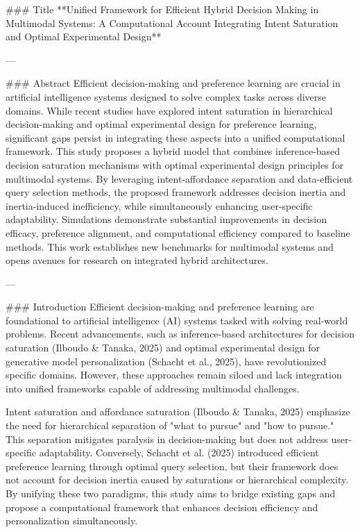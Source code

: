 ### Title  
**Unified Framework for Efficient Hybrid Decision Making in Multimodal Systems: A Computational Account Integrating Intent Saturation and Optimal Experimental Design**

---

### Abstract  
Efficient decision-making and preference learning are crucial in artificial intelligence systems designed to solve complex tasks across diverse domains. While recent studies have explored intent saturation in hierarchical decision-making and optimal experimental design for preference learning, significant gaps persist in integrating these aspects into a unified computational framework. This study proposes a hybrid model that combines inference-based decision saturation mechanisms with optimal experimental design principles for multimodal systems. By leveraging intent-affordance separation and data-efficient query selection methods, the proposed framework addresses decision inertia and inertia-induced inefficiency, while simultaneously enhancing user-specific adaptability. Simulations demonstrate substantial improvements in decision efficacy, preference alignment, and computational efficiency compared to baseline methods. This work establishes new benchmarks for multimodal systems and opens avenues for research on integrated hybrid architectures.  

---

### Introduction  
Efficient decision-making and preference learning are foundational to artificial intelligence (AI) systems tasked with solving real-world problems. Recent advancements, such as inference-based architectures for decision saturation (Ilboudo & Tanaka, 2025) and optimal experimental design for generative model personalization (Schacht et al., 2025), have revolutionized specific domains. However, these approaches remain siloed and lack integration into unified frameworks capable of addressing multimodal challenges.

Intent saturation and affordance saturation (Ilboudo & Tanaka, 2025) emphasize the need for hierarchical separation of "what to pursue" and "how to pursue." This separation mitigates paralysis in decision-making but does not address user-specific adaptability. Conversely, Schacht et al. (2025) introduced efficient preference learning through optimal query selection, but their framework does not account for decision inertia caused by saturations or hierarchical complexity. By unifying these two paradigms, this study aims to bridge existing gaps and propose a computational framework that enhances decision efficiency and personalization simultaneously.

